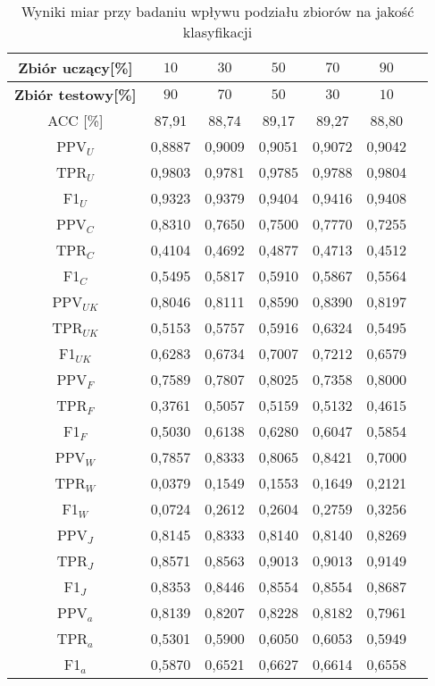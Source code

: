 \documentclass{article}
\begin{document}
\begin{table}[H]
    \centering
    \begin{tabular}{|c|c|c|c|c|c|c}
    \hline
    \textbf{Zbiór uczący[\%]} & \textbf{\(10\)} & \textbf{\(30\)} & \textbf{\(50\)} & \textbf{\(70\)}  & \textbf{\(90\)} \\ \hline
    \textbf{Zbiór testowy[\%]} & \textbf{\(90\)} & \textbf{\(70\)} & \textbf{\(50\)} & \textbf{\(30\)}  & \textbf{\(10\)} \\ \hline
    ACC [\%] & 87,91 & 88,74 & 89,17 & 89,27 & 88,80\\ \hline
    PPV\(_U\) & 0,8887 & 0,9009 & 0,9051 & 0,9072 & 0,9042\\ \hline
    TPR\(_U\) & 0,9803 & 0,9781 & 0,9785 & 0,9788 & 0,9804\\ \hline
    F1\(_U\) & 0,9323 & 0,9379 & 0,9404 & 0,9416 & 0,9408\\ \hline
    PPV\(_C\) & 0,8310 & 0,7650 & 0,7500 & 0,7770 & 0,7255\\ \hline
    TPR\(_C\) & 0,4104 & 0,4692 & 0,4877 & 0,4713 & 0,4512\\ \hline
    F1\(_C\) & 0,5495 & 0,5817 & 0,5910 & 0,5867 & 0,5564\\ \hline
    PPV\(_{UK}\) & 0,8046 & 0,8111 & 0,8590& 0,8390 & 0,8197\\ \hline
    TPR\(_{UK}\) & 0,5153 & 0,5757 & 0,5916 & 0,6324 & 0,5495\\ \hline
    F1\(_{UK}\) & 0,6283 & 0,6734 & 0,7007 & 0,7212 & 0,6579\\ \hline
    PPV\(_F\) & 0,7589 & 0,7807 & 0,8025 & 0,7358 & 0,8000\\ \hline
    TPR\(_F\) & 0,3761 & 0,5057 & 0,5159 & 0,5132 & 0,4615\\ \hline
    F1\(_F\) & 0,5030 & 0,6138 & 0,6280 & 0,6047 & 0,5854\\ \hline
    PPV\(_W\) & 0,7857 & 0,8333 & 0,8065 & 0,8421 & 0,7000\\ \hline
    TPR\(_W\) & 0,0379 & 0,1549 & 0,1553 & 0,1649 & 0,2121\\ \hline
    F1\(_W\) & 0,0724 & 0,2612 & 0,2604 & 0,2759 & 0,3256\\ \hline
    PPV\(_J\) & 0,8145 & 0,8333 & 0,8140 & 0,8140 & 0,8269\\ \hline
    TPR\(_J\) & 0,8571 & 0,8563 & 0,9013 & 0,9013 & 0,9149\\ \hline
    F1\(_J\) & 0,8353 & 0,8446 & 0,8554 & 0,8554 & 0,8687\\ \hline
    PPV\(_a\) & 0,8139 & 0,8207 & 0,8228 & 0,8182 & 0,7961 \\ \hline
    TPR\(_a\) & 0,5301 & 0,5900 & 0,6050 & 0,6053 & 0,5949\\ \hline
    F1\(_a\) & 0,5870 & 0,6521 & 0,6627 & 0,6614 & 0,6558\\ \hline
    \end{tabular}
    \caption{Wyniki miar przy badaniu wpływu podziału zbiorów na jakość klasyfikacji}
\end{table}
\end{document}
